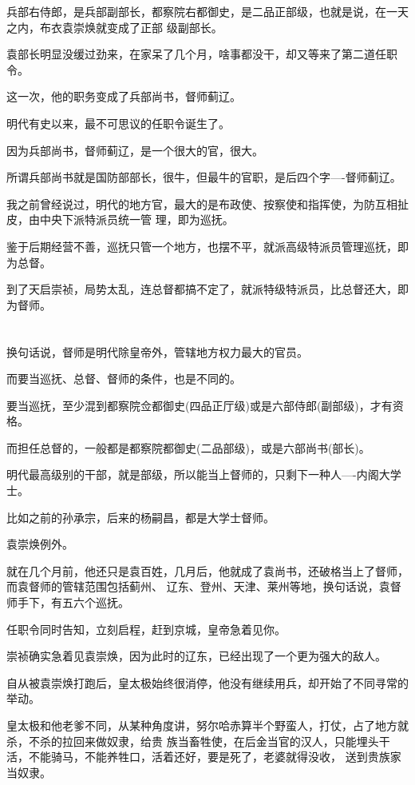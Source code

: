 \documentclass[11pt,a4paper,onecolumn]{article}
\begin{document}
兵部右侍郎，是兵部副部长，都察院右都御史，是二品正部级，也就是说，在一天之内，布衣袁崇焕就变成了正部
级副部长。

袁部长明显没缓过劲来，在家呆了几个月，啥事都没干，却又等来了第二道任职令。

这一次，他的职务变成了兵部尚书，督师蓟辽。

明代有史以来，最不可思议的任职令诞生了。

因为兵部尚书，督师蓟辽，是一个很大的官，很大。

所谓兵部尚书就是国防部部长，很牛，但最牛的官职，是后四个字----督师蓟辽。

我之前曾经说过，明代的地方官，最大的是布政使、按察使和指挥使，为防互相扯皮，由中央下派特派员统一管
理，即为巡抚。

鉴于后期经营不善，巡抚只管一个地方，也摆不平，就派高级特派员管理巡抚，即为总督。

到了天启崇祯，局势太乱，连总督都搞不定了，就派特级特派员，比总督还大，即为督师。

\section[\thesection]{}

换句话说，督师是明代除皇帝外，管辖地方权力最大的官员。

而要当巡抚、总督、督师的条件，也是不同的。

要当巡抚，至少混到都察院佥都御史(四品正厅级)或是六部侍郎(副部级)，才有资格。

而担任总督的，一般都是都察院都御史(二品部级)，或是六部尚书(部长)。

明代最高级别的干部，就是部级，所以能当上督师的，只剩下一种人----内阁大学士。

比如之前的孙承宗，后来的杨嗣昌，都是大学士督师。

袁崇焕例外。

就在几个月前，他还只是袁百姓，几月后，他就成了袁尚书，还破格当上了督师，而袁督师的管辖范围包括蓟州、
辽东、登州、天津、莱州等地，换句话说，袁督师手下，有五六个巡抚。

任职令同时告知，立刻启程，赶到京城，皇帝急着见你。

崇祯确实急着见袁崇焕，因为此时的辽东，已经出现了一个更为强大的敌人。

自从被袁崇焕打跑后，皇太极始终很消停，他没有继续用兵，却开始了不同寻常的举动。

皇太极和他老爹不同，从某种角度讲，努尔哈赤算半个野蛮人，打仗，占了地方就杀，不杀的拉回来做奴隶，给贵
族当畜牲使，在后金当官的汉人，只能埋头干活，不能骑马，不能养牲口，活着还好，要是死了，老婆就得没收，
送到贵族家当奴隶。
\end{document}
